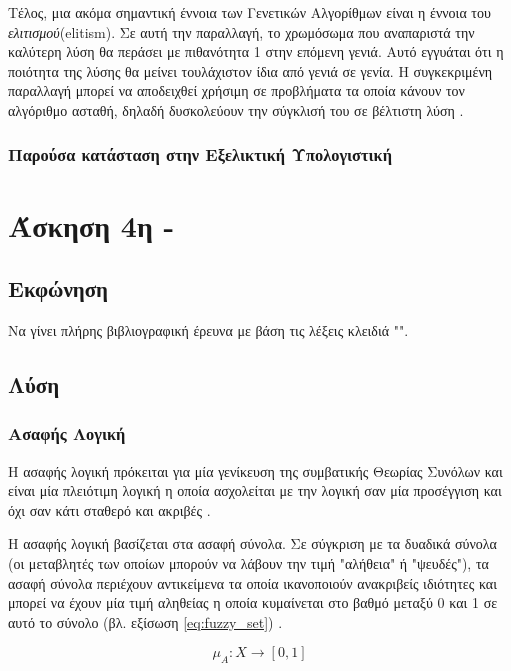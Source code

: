 \documentclass{assignment}
\begin{document}
Τέλος, μια ακόμα σημαντική έννοια των Γενετικών Αλγορίθμων είναι η έννοια του
\emph{ελιτισμού}(elitism). Σε αυτή την παραλλαγή, το χρωμόσωμα που αναπαριστά
την καλύτερη λύση θα περάσει με πιθανότητα 1 στην επόμενη γενιά. Αυτό εγγυάται
ότι η ποιότητα της λύσης θα μείνει τουλάχιστον ίδια από γενιά σε γενία. Η
συγκεκριμένη παραλλαγή μπορεί να αποδειχθεί χρήσιμη σε προβλήματα τα οποία
κάνουν τον αλγόριθμο ασταθή, δηλαδή δυσκολεύουν την σύγκλισή του σε βέλτιστη
λύση \cite{ahn2003elitism}.
\subsubsection*{Παρούσα κατάσταση στην Εξελικτική Υπολογιστική}
\section{Άσκηση 4η - }
\subsection{Εκφώνηση}

Να γίνει πλήρης βιβλιογραφική έρευνα με βάση τις λέξεις κλειδιά "".

\subsection{Λύση}

\subsubsection*{Ασαφής Λογική}
Η ασαφής λογική πρόκειται για μία γενίκευση της συμβατικής Θεωρίας Συνόλων και είναι μία πλειότιμη λογική η οποία ασχολείται με την λογική σαν μία προσέγγιση και όχι σαν κάτι σταθερό και ακριβές \cite{engelbrecht,class_notes,wiki:fuzzy_logic,zadeh1994}. %

Η ασαφής λογική βασίζεται στα ασαφή σύνολα. Σε σύγκριση με τα δυαδικά σύνολα (οι μεταβλητές των οποίων μπορούν να λάβουν την τιμή "αλήθεια" ή "ψευδές"), τα ασαφή σύνολα περιέχουν αντικείμενα τα οποία ικανοποιούν ανακριβείς ιδιότητες και μπορεί να έχουν μία τιμή αληθείας η οποία κυμαίνεται στο βαθμό μεταξύ 0 και 1 σε αυτό το σύνολο (βλ. εξίσωση \eqref{eq:fuzzy_set}) \cite{zadeh1965338}. 

\begin{equation}
\mu_A : X \rightarrow [0,1]
\label{eq:fuzzy_set}
\end{equation}
\end{document}
